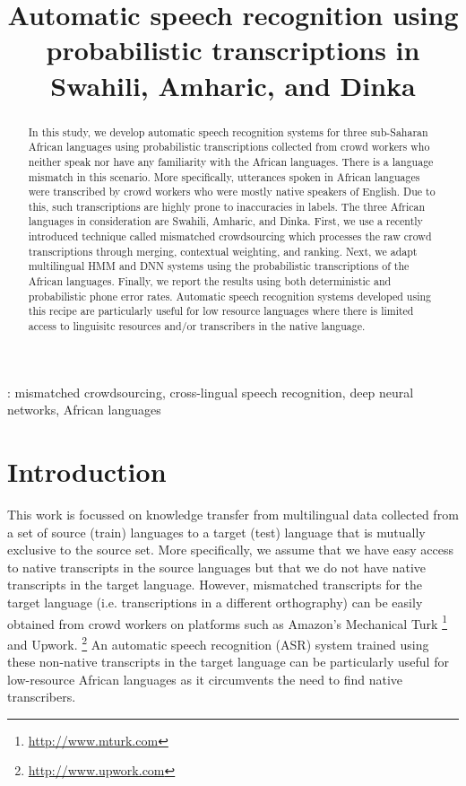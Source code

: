 \documentclass[a4paper]{article}
\title{Automatic speech recognition using probabilistic transcriptions in Swahili, Amharic, and Dinka}
\begin{document}
\maketitle

\begin{abstract}
In this study, we develop automatic speech recognition systems for three sub-Saharan African languages
using probabilistic transcriptions collected from crowd workers who neither speak nor have any familiarity 
with the African languages. There is a language mismatch in this scenario. More specifically, utterances spoken in African languages were transcribed by crowd workers who were mostly native speakers of English. Due to this, such transcriptions are highly prone to inaccuracies in labels. The three African languages in consideration are Swahili, Amharic, and Dinka. First, we use a recently introduced technique called mismatched crowdsourcing which processes the raw crowd transcriptions through merging, contextual weighting, and ranking. Next, we  adapt multilingual HMM and DNN systems using the probabilistic transcriptions of the African languages.  Finally, we report the results using both deterministic and probabilistic phone error rates. Automatic speech recognition systems developed using this recipe are particularly useful for low resource languages where there is limited access to linguisitc resources and/or transcribers in the native language.
\end{abstract}
%
: mismatched crowdsourcing, cross-lingual speech recognition, deep neural networks,
African languages
\vspace{-3mm}
%
\section{Introduction}  \vspace{-2mm}
\label{sec:Introduction}
This work is focussed on knowledge transfer from multilingual data collected from a set of source (train) languages to a target (test) language that is mutually exclusive to the source set. More specifically, we assume that we have easy access to native transcripts in the source languages but that we do not have native transcripts in the target language. However, mismatched transcripts for the target language (i.e. transcriptions in a different orthography) can be easily obtained from crowd workers on platforms such as Amazon's Mechanical Turk%
\footnote{\url{http://www.mturk.com}}
%
and Upwork.%
\footnote{\url{http://www.upwork.com}}
%
An automatic speech recognition (ASR) system trained using these non-native transcripts in the target language can be particularly useful for low-resource African languages as it circumvents the need to find native transcribers. 
\end{document}
